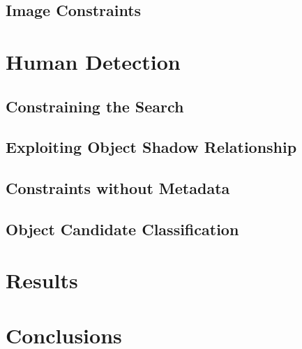 \documentclass{beamer}
\begin{document}
\subsection{Image Constraints}

\section{Human Detection}
\subsection{Constraining the Search}
\subsection{Exploiting Object Shadow Relationship}
\subsection{Constraints without Metadata}
\subsection{Object Candidate Classification}

\section{Results}

\section{Conclusions}
\end{document}
